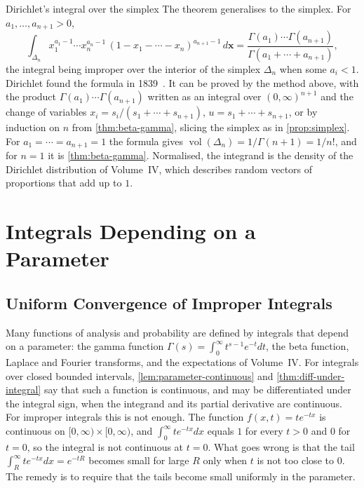 \begin{note}{Dirichlet's integral over the simplex}
The theorem generalises to the simplex. For $a_1,\ldots,a_{n+1}>0$,
\[
\int_{\Delta_n}x_1^{a_1-1}\cdots x_n^{a_n-1}\,(1-x_1-\cdots-x_n)^{a_{n+1}-1}\,d\mathbf x=\frac{\Gamma(a_1)\cdots\Gamma(a_{n+1})}{\Gamma(a_1+\cdots+a_{n+1})},
\]
the integral being improper over the interior of the simplex $\Delta_n$ when some $a_i<1$. Dirichlet found the formula in 1839~\cite{dirichlet1839}. It can be proved by the method above, with the product $\Gamma(a_1)\cdots\Gamma(a_{n+1})$ written as an integral over $(0,\infty)^{n+1}$ and the change of variables $x_i=s_i/(s_1+\cdots+s_{n+1})$, $u=s_1+\cdots+s_{n+1}$, or by induction on $n$ from \cref{thm:beta-gamma}, slicing the simplex as in \cref{prop:simplex}. For $a_1=\cdots=a_{n+1}=1$ the formula gives $\operatorname{vol}(\Delta_n)=1/\Gamma(n+1)=1/n!$, and for $n=1$ it is \cref{thm:beta-gamma}. Normalised, the integrand is the density of the Dirichlet distribution of Volume~IV, which describes random vectors of proportions that add up to $1$.
\end{note}

\section{Integrals Depending on a Parameter}
\label{sec:parameter-integrals}

\subsection{Uniform Convergence of Improper Integrals}

Many functions of analysis and probability are defined by integrals that depend on a parameter: the gamma function $\Gamma(s)=\int_0^\infty t^{s-1}e^{-t}dt$, the beta function, Laplace and Fourier transforms, and the expectations of Volume~IV. For integrals over closed bounded intervals, \cref{lem:parameter-continuous} and \cref{thm:diff-under-integral} say that such a function is continuous, and may be differentiated under the integral sign, when the integrand and its partial derivative are continuous. For improper integrals this is not enough. The function $f(x,t)=te^{-tx}$ is continuous on $[0,\infty)\times[0,\infty)$, and $\int_0^\infty te^{-tx}dx$ equals $1$ for every $t>0$ and $0$ for $t=0$, so the integral is not continuous at $t=0$. What goes wrong is that the tail $\int_R^\infty te^{-tx}dx=e^{-tR}$ becomes small for large $R$ only when $t$ is not too close to $0$. The remedy is to require that the tails become small uniformly in the parameter.


